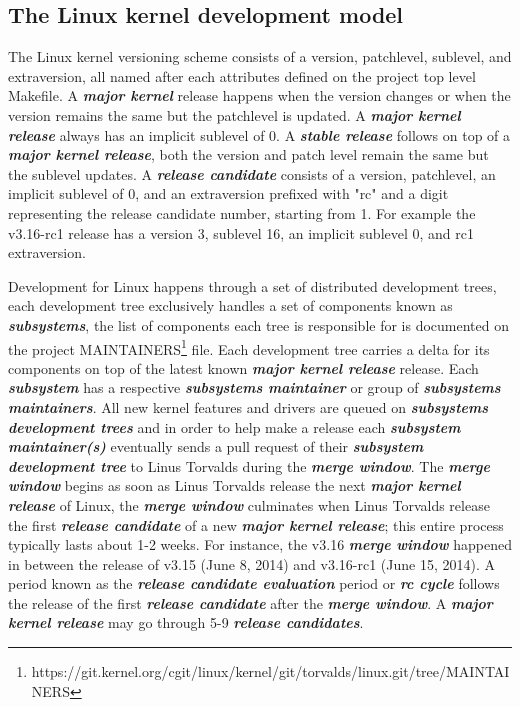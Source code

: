 \subsection{The Linux kernel development model}

The Linux kernel versioning scheme consists of a version, patchlevel,
sublevel, and extraversion, all named after each attributes defined
on the project top level Makefile. A \textbf{\textit{major kernel}} release
happens when the version changes or when the version remains the same but the
patchlevel is updated. A \textbf{\textit{major kernel release}} always has an
implicit sublevel of 0. A \textbf{\textit{stable release}} follows on top of a
\textbf{\textit{major kernel release}}, both the version and patch level remain
the same but the sublevel updates. A \textbf{\textit{release candidate}}
consists of a version, patchlevel, an implicit sublevel of 0, and an
extraversion prefixed with "rc" and a digit representing the release
candidate number, starting from 1. For example the v3.16-rc1 release has a
version 3, sublevel 16, an implicit sublevel 0, and rc1 extraversion.

Development for Linux happens through a set of distributed development
trees, each development tree exclusively handles a set of components known
as \textbf{\textit{subsystems}}, the list of components each tree is
responsible for is documented on the project MAINTAINERS\footnote{https://git.kernel.org/cgit/linux/kernel/git/torvalds/linux.git/tree/MAINTAINERS} file.
Each development tree carries a delta for its components on top of the
latest known \textbf{\textit{major kernel release}} release. Each
\textbf{\textit{subsystem}} has a respective
\textbf{\textit{subsystems maintainer}} or group of
\textbf{\textit{subsystems maintainers}}. All new kernel features and
drivers are queued on \textbf{\textit{subsystems development trees}} and in order
to help make a release each \textbf{\textit{subsystem maintainer(s)}}
eventually sends a pull request of their \textbf{\textit{subsystem development tree}}
to Linus Torvalds during the \textbf{\textit{merge window}}.
The \textbf{\textit{merge window}} begins
as soon as Linus Torvalds release the next \textbf{\textit{major kernel release}}
of Linux, the \textbf{\textit{merge window}} culminates when Linus Torvalds
release the first \textbf{\textit{release candidate}} of a
new \textbf{\textit{major kernel release}}; this entire process typically
lasts about 1-2 weeks. For instance, the v3.16
\textbf{\textit{merge window}} happened in between the release of
v3.15 (June 8, 2014) and v3.16-rc1 (June 15, 2014).  A period known as the
\textbf{\textit{release candidate evaluation}} period
or \textbf{\textit{rc cycle}} follows the release of the first
\textbf{\textit{release candidate}} after the \textbf{\textit{merge window}}.
A \textbf{\textit{major kernel release}} may go through 5-9
\textbf{\textit{release candidates}}.

